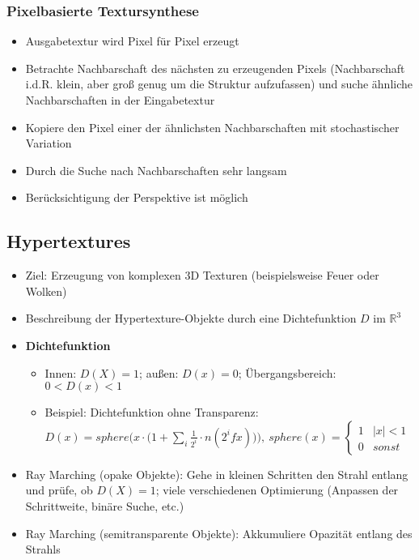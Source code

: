 \subsubsection{Pixelbasierte Textursynthese}
\begin{itemize}
	\item Ausgabetextur wird Pixel für Pixel erzeugt
	\item Betrachte Nachbarschaft des nächsten zu erzeugenden Pixels (Nachbarschaft i.d.R. klein, aber groß genug um die Struktur aufzufassen) und suche ähnliche Nachbarschaften in der Eingabetextur
	\item Kopiere den Pixel einer der ähnlichsten Nachbarschaften mit stochastischer Variation
	\item Durch die Suche nach Nachbarschaften sehr langsam
	\item Berücksichtigung der Perspektive ist möglich
\end{itemize}


\subsection{Hypertextures}
\begin{itemize}
	\item Ziel: Erzeugung von komplexen 3D Texturen (beispielsweise Feuer oder Wolken)
	\item Beschreibung der Hypertexture-Objekte durch eine Dichtefunktion \(D\) im \(\mathbb{R}^3\)
	\item \textbf{Dichtefunktion}
	\begin{itemize}
		\item Innen: \(D(X) = 1\); außen: \(D(x) = 0\); Übergangsbereich: \(0 < D(x) < 1\)
		\item Beispiel: Dichtefunktion ohne Transparenz:  \(D(x) = sphere \bigg(x\cdot \Big( 1+\sum_i \frac{1}{2^i} \cdot n(2^i f x) \Big) \bigg),~sphere(x)=\begin{cases} 1 & |x| < 1 \\ 0 & sonst \end{cases}\)
	\end{itemize}
	\item Ray Marching (opake Objekte): Gehe in kleinen Schritten den Strahl entlang und prüfe, ob \(D(X) = 1 \); viele verschiedenen Optimierung (Anpassen der Schrittweite, binäre Suche, etc.)
	\item Ray Marching (semitransparente Objekte): Akkumuliere Opazität entlang des Strahls
\end{itemize}



